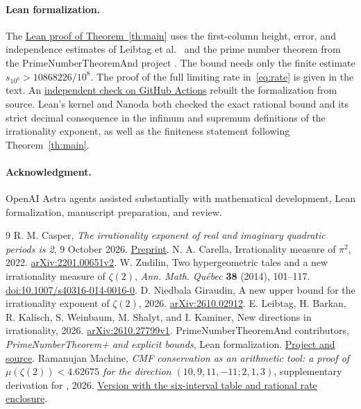 \documentclass[11pt]{article}
\begin{document}
\clearpage
\paragraph{Lean formalization.}
The \href{https://github.com/Mattie/math/blob/02d402999844a7b9524c1668d54e6314979c7569/verification/prime-window/inputs/recipes/WindowFinal.lean#L35-L48}{Lean proof of Theorem~\ref{th:main}}
uses the first-column height, error, and independence estimates of
Leibtag et al.\ \cite{L,LC} and the prime number theorem from the
PrimeNumberTheoremAnd project \cite{PNT}. The bound needs only the finite
estimate $s_{10^6}>10868226/10^8$. The proof of the full limiting rate
in~\eqref{eq:rate} is given in the text.
An \href{https://github.com/Mattie/math/actions/runs/45713249120}{independent check on GitHub Actions}
rebuilt the formalization from source. Lean's kernel and Nanoda both
checked the exact rational bound and its strict decimal consequence
in the infimum and supremum definitions of the irrationality exponent,
as well as the finiteness statement following Theorem~\ref{th:main}.

\paragraph{Acknowledgment.} OpenAI Astra agents assisted substantially
with mathematical development, Lean formalization, manuscript
preparation, and review.

\begin{thebibliography}{9}
\small\setlength{\itemsep}{3pt}
R. M. Casper, \emph{The irrationality exponent of real and imaginary
quadratic periods is 2}, 9 October 2026.
\href{https://github.com/Mattie/math/blob/d9de38369ed65117d61b5230accaa9dbb930d337/preprints/The-irrationality-exponent-of-real-and-imaginary-quadratic-periods-is-2-October-9-2026/paper.pdf}{Preprint}.
N. A. Carella, Irrationality measure of $\pi^2$, 2022.
\href{https://arxiv.org/abs/2201.00651v2}{arXiv:2201.00651v2}.
W. Zudilin, Two hypergeometric tales and a new irrationality measure
of $\zeta(2)$, \emph{Ann. Math. Qu\'ebec} \textbf{38} (2014), 101--117.
\href{https://doi.org/10.1007/s40316-014-0016-0}{doi:10.1007/s40316-014-0016-0}.
D. Niedbala Giraudin, A new upper bound for the irrationality exponent
of $\zeta(2)$, 2026. \href{https://arxiv.org/abs/2610.02912}{arXiv:2610.02912}.
E. Leibtag, H. Barkan, R. Kalisch, S. Weinbaum, M. Shalyt, and
I. Kaminer, New directions in irrationality, 2026.
\href{https://arxiv.org/abs/2610.27799v1}{arXiv:2610.27799v1}.
PrimeNumberTheoremAnd contributors, \emph{PrimeNumberTheorem+
and explicit bounds}, Lean formalization.
\href{https://github.com/AlexKontorovich/PrimeNumberTheoremAnd/tree/127b50e33f6033e2147921167a117af96d9ba4ea}{Project and source}.
Ramanujan Machine, \emph{CMF conservation as an arithmetic tool:
a proof of $\mu(\zeta(2))<4.62675$ for the direction
$(10,9,11,-11;2,1,3)$}, supplementary derivation
for \cite{L}, 2026. \href{https://github.com/RamanujanMachine/zeta2_four_trajectory_matrices/blob/a0e8ac417cddc6ffa88e43cfd68d2b58ea339517/results/zeta2_complete_proof/zeta2_complete_proof.tex}{Version with the six-interval table and rational rate enclosure}.
\end{thebibliography}
\end{document}
